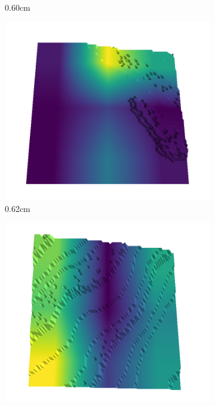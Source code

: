 \begin{figure}[H]
\begin{subfigure}[b]{0.192\linewidth}
    \caption{0.60cm}
    \label{fig : quarry-best-14}
    \end{subfigure}
    \begin{subfigure}[b]{0.192\linewidth}
    \includegraphics[width=\linewidth]{../img/5/quarry/best/62-patch-3d-majavi-colormap-140.png}
    \caption{0.62cm}
    \label{fig : quarry-best-15}
    \end{subfigure}
    \begin{subfigure}[b]{0.192\linewidth}
    \includegraphics[width=\linewidth]{../img/5/quarry/best/63-patch-3d-majavi-colormap-150.png}

\end{subfigure}
\end{figure}
